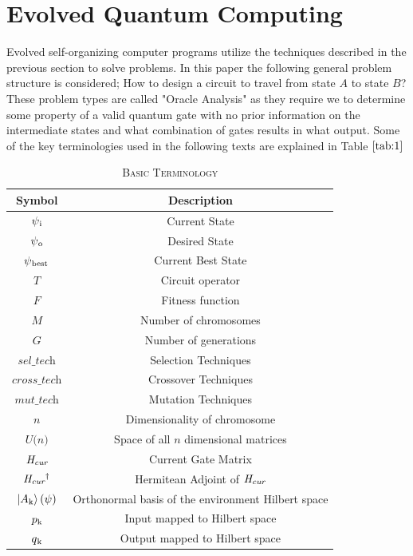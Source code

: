 \documentclass[conference]{IEEEtran}
\begin{document}
\section{Evolved Quantum Computing}

Evolved self-organizing computer programs \cite{self} utilize the techniques described in the previous section to solve problems. In this paper the following general problem structure is considered; How to design a circuit to travel from state $\textit{A}$ to state $\textit{B}$? These problem types are called "Oracle Analysis" as they require we to determine some property of a valid quantum gate with no prior information on the intermediate states and what combination of gates results in what output. Some of the key terminologies used in the following texts are explained in Table $\ref{tab:1}$



\begin{table}[!t]
\caption{\textsc{Basic Terminology}}
\label{tab:1}
\centering
{
\begin{tabular}{| c | c |}
\hline
Symbol  & Description \\
\hline
$\psi\textsubscript{i}$ & Current State \\ 
$\psi\textsubscript{o}$ & Desired State \\
$\psi\textsubscript{best}$ & Current Best State \\
$\textit{T}$ & Circuit operator\\
$\textit{F}$ & Fitness function\\
$\textit{M}$ & Number of chromosomes\\
$\textit{G}$ & Number of generations\\
$\textit{sel\_tech}$ & Selection Techniques\\
$\textit{cross\_tech}$ & Crossover Techniques\\
$\textit{mut\_tech}$ & Mutation Techniques\\
$\textit{n}$ & Dimensionality of chromosome\\
$\textit{U(n)}$ & Space of all $\textit{n}$ dimensional matrices\\
$\textit{H\textsubscript{cur}}$ & Current Gate Matrix\\
$\textit{H\textsubscript{cur}\textsuperscript{$\dagger$}}$ & Hermitean Adjoint of $\textit{H\textsubscript{cur}}$\\
$\ket{A\textsubscript{k}}(\psi)$ & Orthonormal basis of the environment Hilbert space\\
$p\textsubscript{k}$ & Input mapped to Hilbert space\\
$q\textsubscript{k}$ & Output mapped to Hilbert space\\
\hline
\end{tabular}
}
\end{table}
\end{document}
